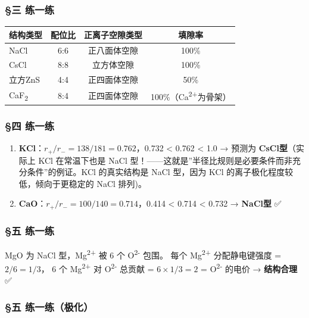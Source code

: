 \subsubsection{§三 练一练}\label{ux4e09-ux7ec3ux4e00ux7ec3}

{\def\LTcaptype{none} %
\begin{longtable}[]{@{}lccc@{}}
\toprule\noalign{}
结构类型 & 配位比 & 正离子空隙类型 & 填隙率 \\
\midrule\noalign{}
\endhead
\bottomrule\noalign{}
\endlastfoot
NaCl & 6:6 & 正八面体空隙 & 100\% \\
CsCl & 8:8 & 立方体空隙 & 100\% \\
立方ZnS & 4:4 & 正四面体空隙 & 50\% \\
CaF\textsubscript{2} & 8:4 & 正四面体空隙 & 100\%（Ca\textsuperscript{2+}为骨架） \\
\end{longtable}
}

\subsubsection{§四 练一练}\label{ux56db-ux7ec3ux4e00ux7ec3}

\begin{enumerate}
\def\labelenumi{(\arabic{enumi})}
\item
  \textbf{KCl}：\(r_+/r_- = 138/181 = 0.762\)，0.732 \textless{} 0.762 \textless{} 1.0 → 预测为 \textbf{CsCl型}（实际上 KCl 在常温下也是 NaCl 型！------这就是''半径比规则是必要条件而非充分条件''的例证。KCl 的真实结构是 NaCl 型，因为 KCl 的离子极化程度较低，倾向于更稳定的 NaCl 排列)。
\item
  \textbf{CaO}：\(r_+/r_- = 100/140 = 0.714\)，0.414 \textless{} 0.714 \textless{} 0.732 → \textbf{NaCl型} ✅
\end{enumerate}

\subsubsection{§五 练一练}\label{ux4e94-ux7ec3ux4e00ux7ec3}

MgO 为 NaCl 型，Mg\textsuperscript{2+} 被 6 个 O\textsuperscript{2-} 包围。
每个 Mg\textsuperscript{2+} 分配静电键强度 = \(2/6 = 1/3\)，
6 个 Mg\textsuperscript{2+} 对 O\textsuperscript{2-} 总贡献 = \(6 \times 1/3 = 2\) = O\textsuperscript{2-} 的电价 → \textbf{结构合理} ✅

\subsubsection{§五 练一练（极化）}\label{ux4e94-ux7ec3ux4e00ux7ec3ux6781ux5316}

